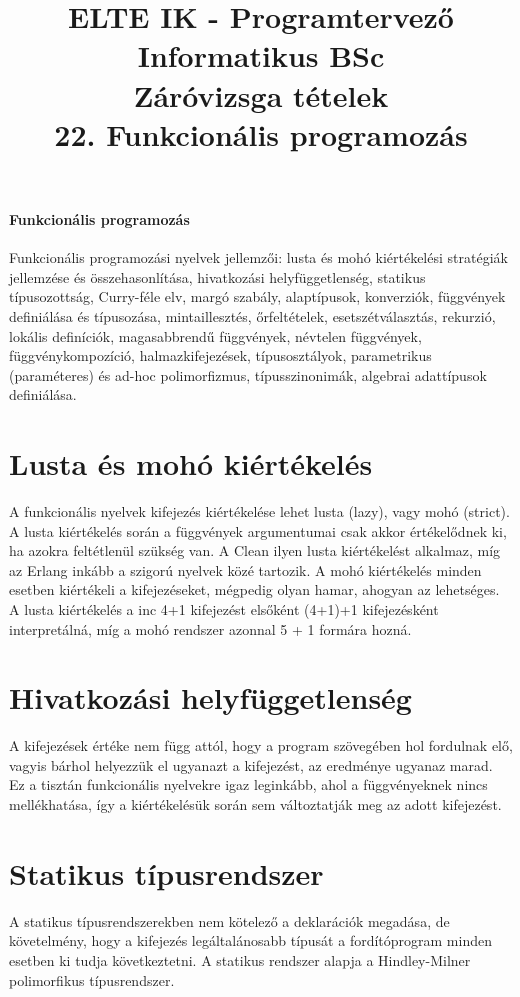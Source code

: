 \documentclass[margin=0px]{article}
\title{\textbf{{\Large ELTE IK - Programtervező Informatikus BSc} \vspace{0.2cm} \\ {\huge Záróvizsga tételek}} \vspace{0.3cm} \\ 22. Funkcionális programozás}
\author{}
\date{}
\newenvironment{tetel}[1]{\paragraph{#1 \\}}{}
\begin{document}
\maketitle

\begin{tetel}{Funkcionális programozás}
    Funkcionális programozási nyelvek jellemzői: lusta és mohó kiértékelési stratégiák jellemzése és összehasonlítása, hivatkozási helyfüggetlenség, statikus típusozottság, Curry-féle elv, margó szabály, alaptípusok, konverziók, függvények definiálása és típusozása, mintaillesztés, őrfeltételek, esetszétválasztás, rekurzió, lokális definíciók, magasabbrendű függvények, névtelen függvények, függvénykompozíció, halmazkifejezések, típusosztályok, parametrikus (paraméteres) és ad-hoc polimorfizmus, típusszinonimák, algebrai adattípusok definiálása.
\end{tetel}

\section{Lusta és mohó kiértékelés}
A funkcionális nyelvek kifejezés kiértékelése lehet lusta (lazy), vagy mohó (strict). A lusta kiértékelés során a függvények argumentumai csak akkor értékelődnek ki, ha azokra feltétlenül szükség van. A Clean ilyen lusta kiértékelést alkalmaz, míg az Erlang inkább a szigorú nyelvek közé tartozik. A mohó kiértékelés minden esetben kiértékeli a kifejezéseket, mégpedig olyan hamar, ahogyan az lehetséges. A lusta kiértékelés a inc 4+1 kifejezést elsőként (4+1)+1 kifejezésként interpretálná, míg a mohó rendszer azonnal 5 + 1 formára hozná.

\section{Hivatkozási helyfüggetlenség}
A kifejezések értéke nem függ attól, hogy a program szövegében hol fordulnak elő, vagyis bárhol helyezzük el ugyanazt a kifejezést, az eredménye ugyanaz marad. Ez a tisztán funkcionális nyelvekre igaz leginkább, ahol a függvényeknek nincs mellékhatása, így a kiértékelésük során sem változtatják meg az adott kifejezést.

\section{Statikus típusrendszer}
A statikus típusrendszerekben nem kötelező a deklarációk megadása, de követelmény, hogy a kifejezés legáltalánosabb típusát a fordítóprogram minden esetben ki tudja következtetni. A statikus rendszer alapja a Hindley-Milner polimorfikus típusrendszer.
\end{document}
